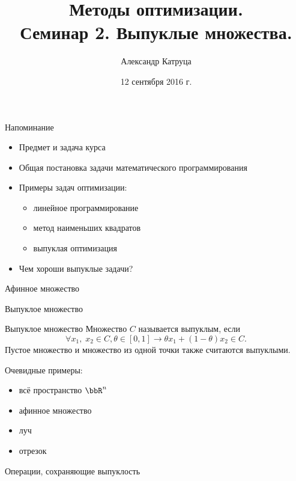 \documentclass[12pt,russian]{beamer}
\title[Семинар 1]{Методы оптимизации. \\
Семинар 2. Выпуклые множества.}
\author{Александр Катруца}
\institute{Московский физико-технический институт,\\
Факультет Управления и Прикладной Математики}
\date{12 сентября 2016 г.}
\begin{document}
\begin{frame}
\maketitle
\end{frame}

\begin{frame}{Напоминание}

\begin{itemize}
\item Предмет и задача курса
\item Общая постановка задачи математического программирования
\item Примеры задач оптимизации: 
\begin{itemize}
\item линейное программирование
\item метод наименьших квадратов
\item выпуклая оптимизация
\end{itemize}
\item Чем хороши выпуклые задачи?
\end{itemize}
\end{frame}

\begin{frame}{Афинное множество}

\end{frame}

\begin{frame}{Выпуклое множество}
\begin{block}{Выпуклое множество}
Множество $C$ называется выпуклым, если 
\[
\forall x_1, \; x_2 \in C, \theta \in [0, 1] \rightarrow \theta x_1 + (1 - \theta)x_2 \in C.
\]
Пустое множество и множество из одной точки также считаются выпуклыми.
\end{block}
Очевидные примеры:
\begin{itemize}
\item всё пространство $\bbR^n$
\item афинное множество
\item луч
\item отрезок
\end{itemize}
\end{frame}

\begin{frame}{Операции, сохраняющие выпуклость}
\end{frame}
\end{document}
